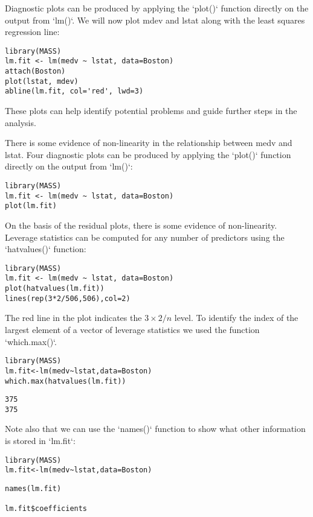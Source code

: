 \documentclass[11pt]{article}
\begin{document}
Diagnostic plots can be produced by applying the `plot()` function directly on the output from `lm()`. We will now plot mdev and lstat along with the least squares regression line:

\begin{verbatim}
library(MASS)
lm.fit <- lm(medv ~ lstat, data=Boston)
attach(Boston)
plot(lstat, mdev)
abline(lm.fit, col='red', lwd=3)
\end{verbatim}

These plots can help identify potential problems and guide further steps in the analysis.

There is some evidence of non-linearity in the relationship between medv and lstat. Four diagnostic plots can be produced by applying the `plot()` function directly on the output from `lm()`:

\begin{verbatim}
library(MASS)
lm.fit <- lm(medv ~ lstat, data=Boston)
plot(lm.fit)
\end{verbatim}

On the basis of the residual plots, there is some evidence of non-linearity. Leverage statistics can be computed for any number of predictors using the `hatvalues()` function:

\begin{verbatim}
library(MASS)
lm.fit <- lm(medv ~ lstat, data=Boston)
plot(hatvalues(lm.fit))
lines(rep(3*2/506,506),col=2)
\end{verbatim}

The red line in the plot indicates the $3 \times 2/n$ level. To identify the index of the largest element of a vector of
leverage statistics we used the function `which.max()`.

\begin{verbatim}
library(MASS)
lm.fit<-lm(medv~lstat,data=Boston)
which.max(hatvalues(lm.fit))
\end{verbatim}

\begin{verbatim}
375
375
\end{verbatim}

Note also that we can use the `names()` function to show what other information is stored in `lm.fit`:

\begin{verbatim}
library(MASS)
lm.fit<-lm(medv~lstat,data=Boston)
\end{verbatim}

\begin{verbatim}
names(lm.fit)

lm.fit$coefficients
\end{verbatim}
\end{document}
